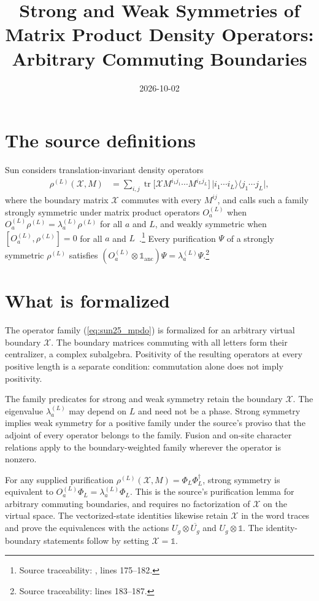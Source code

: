 \documentclass{article}
\title{Strong and Weak Symmetries of Matrix Product Density Operators: Arbitrary Commuting Boundaries}
\author{}
\date{2026-10-02}
\begin{document}
\maketitle
{}

\section{The source definitions}
Sun considers translation-invariant density operators
\begin{align}
    \rho^{(L)}(\mathcal X,M) & =\sum_{i,j}\operatorname{tr}\bigl[\mathcal X
        M^{i_1j_1}\cdots M^{i_Lj_L}\bigr]\,\lvert i_1\cdots i_L\rangle\langle
    j_1\cdots j_L\rvert,
    \label{eq:sun25_mpdo}
\end{align}
where the boundary matrix $\mathcal X$ commutes with every $M^{ij}$, and calls
such a family strongly symmetric under matrix product operators
$O_a^{(L)}$ when $O_a^{(L)}\rho^{(L)}=\lambda_a^{(L)}\rho^{(L)}$ for all $a$
and $L$, and weakly symmetric when $[O_a^{(L)},\rho^{(L)}]=0$ for all $a$ and
$L$~\cite{Sun2025Anomalous}.\footnote{Source traceability:
    , lines 175--182.}
Every purification $\Psi$ of a strongly symmetric $\rho^{(L)}$ satisfies
$(O_a^{(L)}\otimes\mathbb 1_{\mathrm{anc}})\Psi=\lambda_a^{(L)}\Psi$.\footnote{Source
    traceability: lines 183--187.}

\section{What is formalized}
The operator family (\ref{eq:sun25_mpdo}) is formalized for an arbitrary
virtual boundary $\mathcal X$. The boundary matrices commuting with all
letters form their centralizer, a complex subalgebra. Positivity of the
resulting operators at every positive length is a separate condition:
commutation alone does not imply positivity.

The family predicates for strong and weak symmetry retain the boundary
$\mathcal X$. The eigenvalue $\lambda_a^{(L)}$ may depend on $L$ and need not
be a phase. Strong symmetry implies weak symmetry for a positive family
under the source's proviso that the adjoint of every operator belongs to
the family. Fusion and on-site character relations apply to the
boundary-weighted family wherever the operator is nonzero.

For any supplied purification
$\rho^{(L)}(\mathcal X,M)=\Phi_L\Phi_L^\dagger$, strong symmetry is equivalent
to $O_a^{(L)}\Phi_L=\lambda_a^{(L)}\Phi_L$. This is the source's purification
lemma for arbitrary commuting boundaries, and requires no factorization
of $\mathcal X$ on the virtual space. The vectorized-state identities
likewise retain $\mathcal X$ in the word traces and prove the equivalences
with the actions $U_g\otimes\overline{U_g}$ and $U_g\otimes\mathbb 1$.
The identity-boundary statements follow by setting $\mathcal X=\mathbb 1$.
\end{document}
